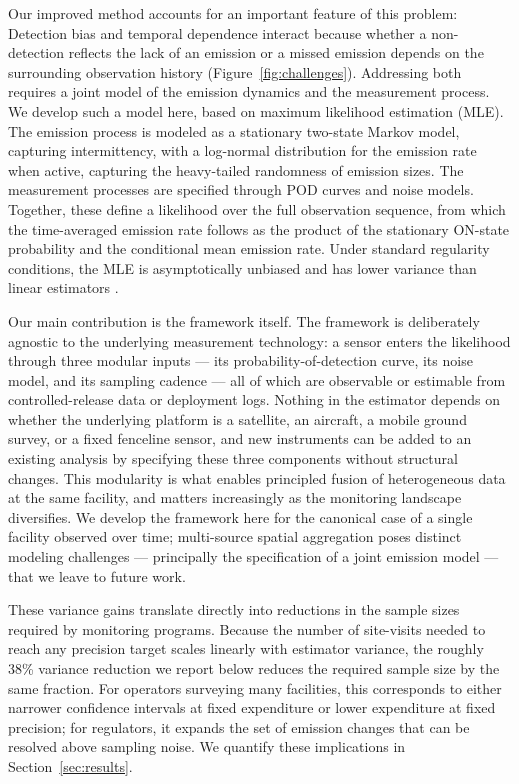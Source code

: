 \documentclass[unnumsec,webpdf,modern,mediumone]{oup-authoring-template}
\newcommand{\new}[1]{{\color{blue}#1}}
\newcommand{\edit}[1]{{\color{magenta}#1}}
\begin{document}

Our improved method accounts for an important feature of this problem: Detection bias and temporal dependence interact because whether a non-detection reflects the lack of an emission or a missed emission depends on the surrounding observation history (Figure~\ref{fig:challenges}). Addressing both requires a joint model of the emission dynamics and the measurement process. We develop such a model here, based on maximum likelihood estimation (MLE). The emission process is modeled as a stationary two-state Markov model, capturing intermittency, with a log-normal distribution for the emission rate when active, capturing the heavy-tailed randomness of emission sizes. The measurement processes are specified through POD curves and noise models. Together, these define a likelihood over the full observation sequence, from which the time-averaged emission rate follows as the product of the stationary ON-state probability and the conditional mean emission rate. Under standard regularity conditions, the MLE is asymptotically unbiased and has lower variance than linear estimators \citep{vanderVaart1998}.

Our main contribution is the framework itself. \edit{The framework is deliberately agnostic to the underlying measurement technology: a sensor enters the likelihood through three modular inputs — its probability-of-detection curve, its noise model, and its sampling cadence — all of which are observable or estimable from controlled-release data or deployment logs. Nothing in the estimator depends on whether the underlying platform is a satellite, an aircraft, a mobile ground survey, or a fixed fenceline sensor, and new instruments can be added to an existing analysis by specifying these three components without structural changes.} %
This modularity is what enables principled fusion of heterogeneous data at the same facility, and matters increasingly as the monitoring landscape diversifies. \edit{We develop the framework here for the canonical case of a single facility observed over time; multi-source spatial aggregation poses distinct modeling challenges — principally the specification of a joint emission model — that we leave to future work.}

\new{These variance gains translate directly into reductions in the sample sizes required by monitoring programs. Because the number of site-visits needed to reach any precision target scales linearly with estimator variance, the roughly 38\% variance reduction we report below reduces the required sample size by the same fraction. For operators surveying many facilities, this corresponds to either narrower confidence intervals at fixed expenditure or lower expenditure at fixed precision; for regulators, it expands the set of emission changes that can be resolved above sampling noise. We quantify these implications in Section~\ref{sec:results}.}
\end{document}
